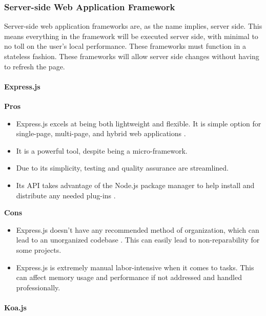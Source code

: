 \subsubsection{Server-side Web Application Framework}
Server-side web application frameworks are, as the name implies, server side. This means everything in the framework will be executed server side, with minimal to no toll on the user's local performance. These frameworks must function in a stateless fashion. These frameworks will allow server side changes without having to refresh the page.
	\paragraph{Express.js}
			\textbf{Pros}
			\begin{itemize}
				\item Express.js excels at being both lightweight and flexible. It is simple option for single-page, multi-page, and hybrid web applications \cite{expressPC}. 
				\item It is a powerful tool, despite being a micro-framework. 
				\item Due to its simplicity, testing and quality assurance are streamlined. 
				\item Its API takes advantage of the Node.js package manager to help install and distribute any needed plug-ins \cite{expressPC}.
			\end{itemize}	
		\textbf{Cons}
			\begin{itemize}
				\item Express.js doesn't have any recommended method of organization, which can lead to an unorganized codebase \cite{expressPC}. This can easily lead to non-reparability for some projects. 
				\item Express.js is extremely manual labor-intensive when it comes to tasks. This can affect memory usage and performance if not addressed and handled professionally.
			\end{itemize}	
	\paragraph{Koa.js}
	
